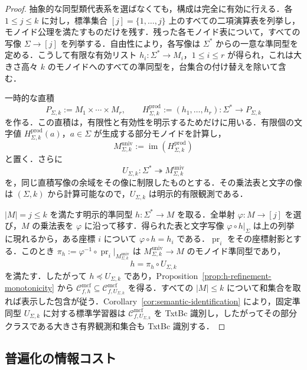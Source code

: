 \documentclass[11pt,a4paper]{ltjsarticle}
\numberwithin{equation}{section}
\theoremstyle{plain}
\theoremstyle{definition}
\theoremstyle{remark}
\newcommand{\Cmcf}[2]{\mathcal{C}^{\mathrm{mcf}}_{#1,#2}}
\begin{document}
\begin{proof}
抽象的な同型類代表系を選ばなくても，構成は完全に有効に行える．各 \(1\le j\le k\) に対し，標準集合
\([j]=\{1,\ldots,j\}\) 上のすべての二項演算表を列挙し，モノイド公理を満たすものだけを残す．残った各モノイド表について，すべての写像 \(\Sigma\to[j]\) を列挙する．自由性により，各写像は \(\Sigma^*\) からの一意な準同型を定める．こうして有限な有効リスト
\(h_i:\Sigma^*\to M_i\)，\(1\le i\le r\) が得られ，これは大きさ高々 \(k\) のモノイドへのすべての準同型を，台集合の付け替えを除いて含む．

一時的な直積
\[
  P_{\Sigma,k}:=M_1\times\cdots\times M_r,
  \qquad
  H^{\mathrm{prod}}_{\Sigma,k}:=(h_1,\ldots,h_r):
     \Sigma^*\to P_{\Sigma,k}
\]
を作る．この直積は，有限性と有効性を明示するためだけに用いる．有限個の文字値
\(H^{\mathrm{prod}}_{\Sigma,k}(a)\)，\(a\in\Sigma\) が生成する部分モノイドを計算し，
\[
  M_{\Sigma,k}^{\mathrm{univ}}
  :=\operatorname{im}(H^{\mathrm{prod}}_{\Sigma,k})
\]
と置く．さらに
\[
  U_{\Sigma,k}:\Sigma^*\twoheadrightarrow M_{\Sigma,k}^{\mathrm{univ}}
\]
を，同じ直積写像の余域をその像に制限したものとする．その乗法表と文字の像は \((\Sigma,k)\) から計算可能なので，\(U_{\Sigma,k}\) は明示的有限観測である．

\(|M|=j\le k\) を満たす明示的準同型 \(h:\Sigma^*\to M\) を取る．全単射 \(\varphi:M\to[j]\) を選び，\(M\) の乗法表を \(\varphi\) に沿って移す．得られた表と文字写像 \(\varphi\circ h|_\Sigma\) は上の列挙に現れるから，ある座標 \(i\) について \(\varphi\circ h=h_i\) である．\(\operatorname{pr}_i\) をその座標射影とする．このとき
\(\pi_h:=\varphi^{-1}\circ\operatorname{pr}_i|_{M_{\Sigma,k}^{\mathrm{univ}}}\)
は \(M_{\Sigma,k}^{\mathrm{univ}}\to M\) のモノイド準同型であり，
\[
  h=\pi_h\circ U_{\Sigma,k}
\]
を満たす．したがって \(h\preceq U_{\Sigma,k}\) であり，Proposition~\ref{prop:h-refinement-monotonicity} から
\(\Cmcf{f}{h}\subseteq\Cmcf{f}{U_{\Sigma,k}}\) を得る．すべての \(|M|\le k\) について和集合を取れば表示した包含が従う．Corollary~\ref{cor:semantic-identification} により，固定準同型 \(U_{\Sigma,k}\) に対する標準学習器は \(\Cmcf{f}{U_{\Sigma,k}}\) を TxtBc 識別し，したがってその部分クラスである大きさ有界観測和集合も TxtBc 識別する．
\end{proof}


\subsection{普遍化の情報コスト}
\label{subsec:uniform-observation-bound}
\end{document}
